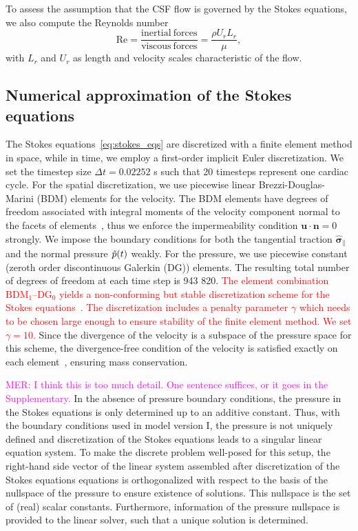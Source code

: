 \documentclass[fleqn]{wlscirep}
\newcommand{\nn}{\mathbf{n}}
\newcommand{\uu}{\mathbf{u}}
\newcommand{\bsig}{\bm{\sigma}}
\newcommand{\bsigpar}{\hat{\bsig}_{\parallel}}
\newcommand{\mer}[1]{\textcolor{magenta}{#1}}
\newcommand{\fixme}[1]{\textcolor{red}{#1}}
\begin{document}
To assess the assumption that the CSF flow is governed by the Stokes equations, we also compute the Reynolds number
\begin{equation*}
    \mathrm{Re} = \frac{\mathrm{inertial \ forces}}{\mathrm{viscous \ forces}} = \frac{\rho U_r L_r}{\mu},
\end{equation*}
with $L_r$ and $U_r$ as length and velocity scales characteristic of the flow. 

\subsection*{Numerical approximation of the Stokes equations}

The Stokes equations~\eqref{eq:stokes_eqs} are discretized with a finite element method in space, while in time, we employ a first-order implicit Euler discretization. We set the timestep size $\Delta t = 0.02252$ s such that 20 timesteps represent one cardiac cycle. For the spatial discretization, we use piecewise linear Brezzi-Douglas-Marini (BDM) elements for the velocity. The BDM elements have degrees of freedom associated with integral moments of the velocity component normal to the facets of elements~\cite{Brezzi1985TwoProblems}, thus we enforce the impermeability condition $\uu\cdot\nn=0$ strongly. We impose the boundary conditions for both the tangential traction $\bsigpar$ and the normal pressure $\Tilde{p}(t)$ weakly. For the pressure, we use piecewise constant (zeroth order discontinuous Galerkin (DG)) elements. The resulting total number of degrees of freedom at each time step is 943 820. \fixme{The element combination $\mathrm{BDM}_1$--$\mathrm{DG}_{0}$ yields a non-conforming but stable discretization scheme for the Stokes equations~\cite{Stenberg1989SomeEquations}. The discretization includes a penalty parameter $\gamma$ which needs to be chosen large enough to ensure stability of the finite element method. We set $\gamma=10$.} Since the divergence of the velocity is a subspace of the pressure space for this scheme, the divergence-free condition of the velocity is satisfied exactly on each element~\cite{Boffi2008FiniteProblem}, ensuring mass conservation. 

\mer{MER: I think this is too much detail. One sentence suffices, or it goes in the Supplementary.}
In the absence of pressure boundary conditions, the pressure in the Stokes equations is only determined up to an additive constant. Thus, with the boundary conditions used in model version I, the pressure is not uniquely defined and discretization of the Stokes equations leads to a singular linear equation system. To make the discrete problem well-posed for this setup, the right-hand side vector of the linear system assembled after discretization of the Stokes equations equations is orthogonalized with respect to the basis of the nullspace of the pressure to ensure existence of solutions. This nullspace is the set of (real) scalar constants. Furthermore, information of the pressure nullspace is provided to the linear solver, such that a unique solution is determined.
\end{document}
